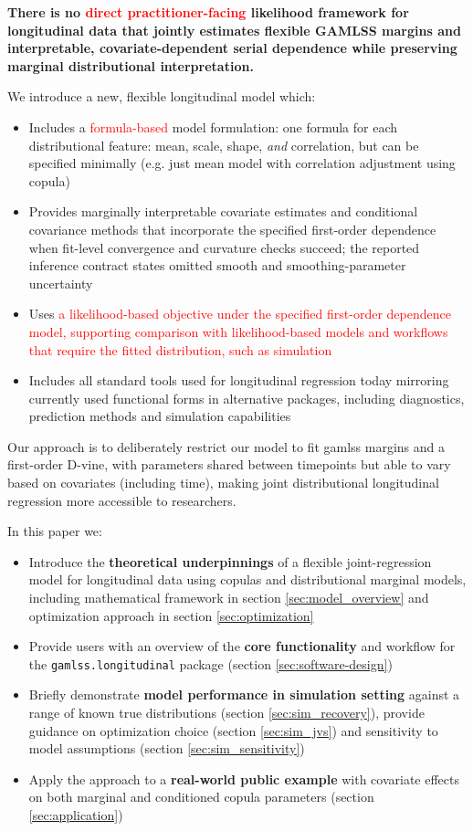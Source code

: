 \documentclass{article}
\newcommand{\jsschange}[1]{\textcolor{red}{#1}}
\begin{document}
\textbf{There is no \jsschange{direct practitioner-facing} likelihood framework for longitudinal data that jointly estimates flexible GAMLSS margins and interpretable, covariate-dependent serial dependence while preserving marginal distributional interpretation.}

We introduce a new, flexible longitudinal model which:
\begin{itemize}
    \item Includes a \jsschange{formula-based} model formulation: one formula for each distributional feature: mean, scale, shape, \textit{and} correlation, but can be specified minimally (e.g. just mean model with correlation adjustment using copula)
    \item Provides marginally interpretable covariate estimates and conditional covariance methods that incorporate the specified first-order dependence when fit-level convergence and curvature checks succeed; the reported inference contract states omitted smooth and smoothing-parameter uncertainty
    \item Uses \jsschange{a likelihood-based objective under the specified first-order dependence model, supporting comparison with likelihood-based models and workflows that require the fitted distribution, such as simulation}
    \item Includes all standard tools used for longitudinal regression today mirroring currently used functional forms in alternative packages, including diagnostics, prediction methods and simulation capabilities
\end{itemize}

Our approach is to deliberately restrict our model to fit gamlss margins and a first-order D-vine, with parameters shared between timepoints but able to vary based on covariates (including time), making joint distributional longitudinal regression more accessible to researchers.

In this paper we:
\begin{itemize}
    \item Introduce the \textbf{theoretical underpinnings} of a flexible joint-regression model for longitudinal data using copulas and distributional marginal models, including mathematical framework in section \ref{sec:model_overview} and optimization approach in section \ref{sec:optimization}
    \item Provide users with an overview of the \textbf{core functionality} and workflow for the \texttt{gamlss.longitudinal} package (section \ref{sec:software-design})
    \item Briefly demonstrate \textbf{model performance in simulation setting} against a range of known true distributions (section \ref{sec:sim_recovery}), provide guidance on optimization choice (section \ref{sec:sim_jvs}) and sensitivity to model assumptions (section \ref{sec:sim_sensitivity})
    \item Apply the approach to a \textbf{real-world public example} with covariate effects on both marginal and conditioned copula parameters (section \ref{sec:application})
\end{itemize}
\end{document}

